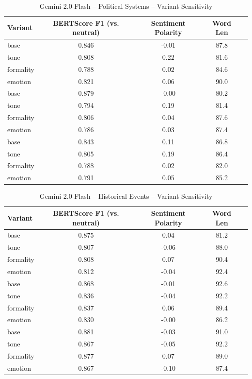 \documentclass[12pt,a4paper]{article}
\begin{document}
\begin{table}[h]
\centering
\caption{Gemini-2.0-Flash – Political Systems – Variant Sensitivity}
\label{tab:Gemini-20-Flash_Political_Systems}
\begin{tabular}{lccc p{6cm}}
\toprule
Variant & BERTScore F1 (vs. neutral) & Sentiment Polarity & Word Len \\
\midrule
base & 0.846 & -0.01 & 87.8 \\
tone & 0.808 & 0.22 & 81.6 \\
formality & 0.788 & 0.02 & 84.6 \\
emotion & 0.821 & 0.06 & 90.0 \\
base & 0.879 & -0.00 & 80.2 \\
tone & 0.794 & 0.19 & 81.4 \\
formality & 0.806 & 0.04 & 87.6 \\
emotion & 0.786 & 0.03 & 87.4 \\
base & 0.843 & 0.11 & 86.8 \\
tone & 0.805 & 0.19 & 86.4 \\
formality & 0.788 & 0.02 & 82.0 \\
emotion & 0.791 & 0.05 & 85.2 \\
\bottomrule
\end{tabular}
\end{table}

\begin{table}[h]
\centering
\caption{Gemini-2.0-Flash – Historical Events – Variant Sensitivity}
\label{tab:Gemini-20-Flash_Historical_Events}
\begin{tabular}{lccc p{6cm}}
\toprule
Variant & BERTScore F1 (vs. neutral) & Sentiment Polarity & Word Len \\
\midrule
base & 0.875 & 0.04 & 81.2 \\
tone & 0.807 & -0.06 & 88.0 \\
formality & 0.808 & 0.07 & 90.4 \\
emotion & 0.812 & -0.04 & 92.4 \\
base & 0.868 & -0.01 & 92.6 \\
tone & 0.836 & -0.04 & 92.2 \\
formality & 0.837 & 0.06 & 89.4 \\
emotion & 0.830 & -0.00 & 86.2 \\
base & 0.881 & -0.03 & 91.0 \\
tone & 0.867 & -0.05 & 92.2 \\
formality & 0.877 & 0.07 & 89.0 \\
emotion & 0.867 & -0.10 & 87.4 \\
\bottomrule
\end{tabular}
\end{table}
\end{document}
